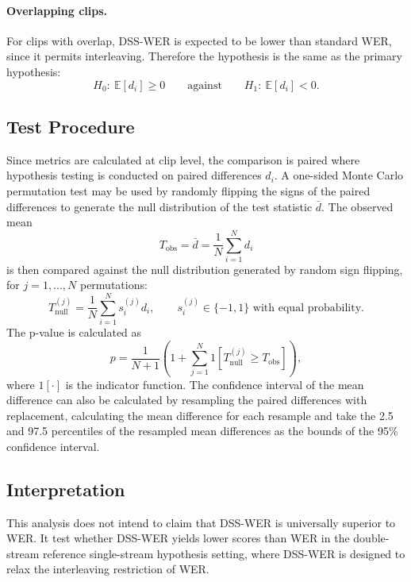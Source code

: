 \paragraph{Overlapping clips.} For clips with overlap, DSS-WER is expected to be lower than standard WER, since it permits interleaving. Therefore the hypothesis is the same as the primary hypothesis:
\begin{equation}
    H_0:\ \mathbb{E}[d_i] \ge 0
    \qquad \text{against} \qquad
    H_1:\ \mathbb{E}[d_i] < 0.
\end{equation}

\subsection{Test Procedure}
Since metrics are calculated at clip level, the comparison is paired where hypothesis testing is conducted on paired differences $d_i$. A one-sided Monte Carlo permutation test may be used by randomly flipping the signs of the paired differences to generate the null distribution of the test statistic $\bar{d}$. The observed mean
\begin{equation}
    T_\text{obs} = \bar{d} = \frac{1}{N}\sum_{i=1}^N d_i
\end{equation}
is then compared against the null distribution generated by random sign flipping, for $j=1,...,N$ permutations:
\begin{equation}
    T_\text{null}^{(j)} = \frac{1}{N}\sum_{i=1}^N s_i^{(j)} d_i, \qquad s_i^{(j)} \in \{-1, 1\} \text{ with equal probability}.
\end{equation}
The p-value is calculated as
\begin{equation}
    p=\frac{1}{N+1}\left(1+\sum_{j=1}^N 1[T_\text{null}^{(j)} \ge T_\text{obs}]\right),
\end{equation}
where $1[\cdot]$ is the indicator function. The confidence interval of the mean difference can also be calculated by resampling the paired differences with replacement, calculating the mean difference for each resample and take the 2.5 and 97.5 percentiles of the resampled mean differences as the bounds of the 95\% confidence interval.

\subsection{Interpretation}
This analysis does not intend to claim that DSS-WER is universally superior to WER. It test whether DSS-WER yields lower scores than WER in the double-stream reference single-stream hypothesis setting, where DSS-WER is designed to relax the interleaving restriction of WER. 

